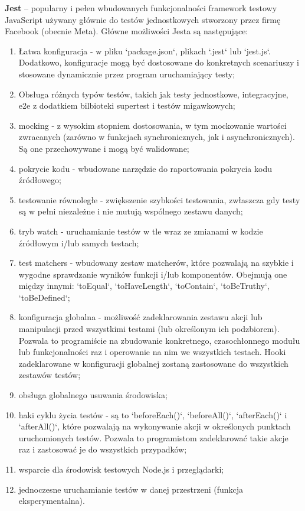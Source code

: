 \documentclass[12pt, a4paper, twoside, openany]{book}
\begin{document}
\textbf{Jest} -- popularny i pełen wbudowanych funkcjonalności framework testowy JavaScript używany głównie do testów jednostkowych stworzony przez firmę Facebook (obecnie Meta). Główne możliwości Jesta są następujące:
\begin{enumerate}[label=--]
    \item Łatwa konfiguracja - w pliku `package.json`, plikach `.jest` lub `jest.js`. Dodatkowo, konfiguracje mogą być dostosowane do konkretnych scenariuszy i stosowane dynamicznie przez program uruchamiający testy;
    \item Obsługa różnych typów testów, takich jak testy jednostkowe, integracyjne, e2e z dodatkiem bilbioteki supertest i testów migawkowych;
    \item mocking - z wysokim stopniem dostosowania, w tym mockowanie wartości zwracanych (zarówno w funkcjach synchronicznych, jak i asynchronicznych). Są one przechowywane i mogą być walidowane;
    \item pokrycie kodu - wbudowane narzędzie do raportowania pokrycia kodu źródłowego;
    \item testowanie równoległe - zwiększenie szybkości testowania, zwłaszcza gdy testy są w pełni niezależne i nie mutują wspólnego zestawu danych;
    \item tryb watch - uruchamianie testów w tle wraz ze zmianami w kodzie źródłowym i/lub samych testach;
    \item test matchers - wbudowany zestaw matcherów, które pozwalają na szybkie i wygodne sprawdzanie wyników funkcji i/lub komponentów. Obejmują one między innymi: `toEqual`, `toHaveLength`, `toContain`, `toBeTruthy`, `toBeDefined`;
    \item konfiguracja globalna - możliwość zadeklarowania zestawu akcji lub manipulacji przed wszystkimi testami (lub określonym ich podzbiorem). Pozwala to programiście na zbudowanie konkretnego, czasochłonnego modułu lub funkcjonalności raz i operowanie na nim we wszystkich testach. Hooki zadeklarowane w konfiguracji globalnej zostaną zastosowane do wszystkich zestawów testów;
    \item obsługa globalnego usuwania środowiska;
    \item haki cyklu życia testów - są to `beforeEach()`, `beforeAll()`, `afterEach()` i `afterAll()`, które pozwalają na wykonywanie akcji w określonych punktach uruchomionych testów. Pozwala to programistom zadeklarować takie akcje raz i zastosować je do wszystkich przypadków;
    \item wsparcie dla środowisk testowych Node.js i przeglądarki;
    \item jednoczesne uruchamianie testów w danej przestrzeni (funkcja eksperymentalna).
\end{enumerate}
\end{document}
